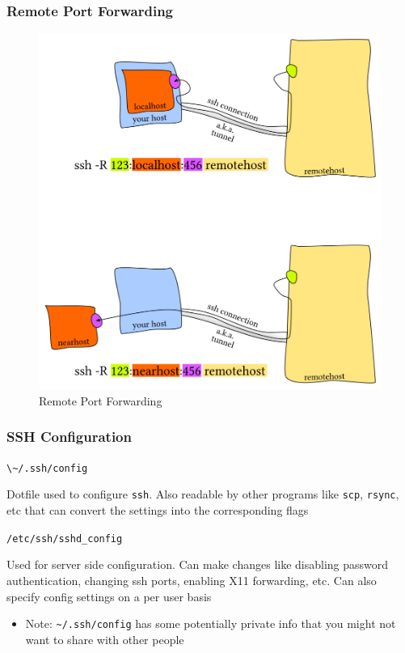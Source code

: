 \documentclass[letterpaper,12pt]{article}
\newcommand*{\lstitem}[1]{
  \setbox0\hbox{\lstinline{#1}}
  \item[\usebox0]
}
\begin{document}
\subsubsection{Remote Port Forwarding}
\begin{figure}[H]
 \includegraphics[width=160mm, scale=0.75]{pictures/remote-port-forwarding.png}
 \caption{Remote Port Forwarding}
\end{figure}

\subsubsection{SSH Configuration}

\begin{description}
 \lstitem{\~/.ssh/config} Dotfile used to configure \lstinline{ssh}. Also readable by other programs like \lstinline{scp}, \lstinline{rsync}, etc that can convert the settings into the corresponding flags
 \lstitem{/etc/ssh/sshd_config} Used for server side configuration. Can make changes like disabling password authentication, changing ssh ports, enabling X11 forwarding, etc. Can also specify config settings on a per user basis
\end{description}

\begin{itemize}
 \item Note: \lstinline{~/.ssh/config} has some potentially private info that you might not want to share with other people
\end{itemize}
\end{document}
